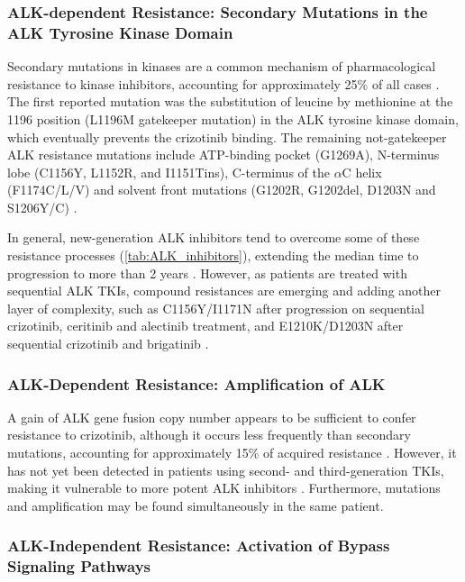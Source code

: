 \subsubsection{ALK-dependent Resistance: Secondary Mutations in the ALK Tyrosine Kinase Domain}

Secondary mutations in kinases are a common mechanism of pharmacological resistance to kinase inhibitors, accounting for approximately 25\% of all cases \cite{Crizotinib_over, TKI_resistance}. The first reported mutation was the substitution of leucine by methionine at the 1196 position (L1196M gatekeeper mutation) in the ALK tyrosine kinase domain, which eventually prevents the crizotinib binding. The remaining not-gatekeeper ALK resistance mutations include ATP-binding pocket (G1269A), N-terminus lobe (C1156Y, L1152R, and I1151Tins), C-terminus of the $\alpha$C helix (F1174C/L/V) and solvent front mutations (G1202R, G1202del, D1203N and S1206Y/C) \cite{ALK_resistance}.

In general, new-generation ALK inhibitors tend to overcome some of these resistance processes (\autoref{tab:ALK_inhibitors}), extending the median time to progression to more than 2 years \cite{EML4_ALK_variants}. However, as patients are treated with sequential ALK TKIs, compound resistances are emerging and adding another layer of complexity, such as C1156Y\slash I1171N after progression on sequential crizotinib, ceritinib and alectinib treatment, and E1210K\slash D1203N after sequential crizotinib and brigatinib \cite{ALK_resistance}.

\subsubsection{ALK-Dependent Resistance: Amplification of ALK}

A gain of ALK gene fusion copy number appears to be sufficient to confer resistance to crizotinib, although it occurs less frequently than secondary mutations, accounting for approximately 15\% of acquired resistance \cite{TKI_acquired}. However, it has not yet been detected in patients using second- and third-generation TKIs, making it vulnerable to more potent ALK inhibitors \cite{ALK_resistance}. Furthermore, mutations and amplification may be found simultaneously in the same patient.

\subsubsection{ALK-Independent Resistance: Activation of Bypass Signaling Pathways}

